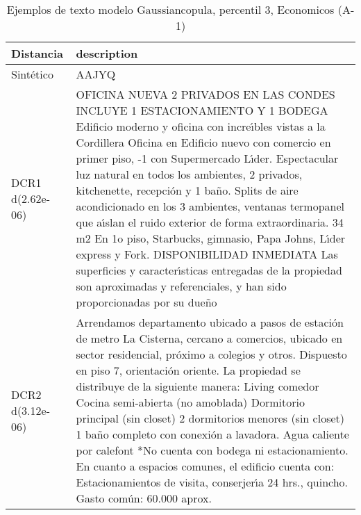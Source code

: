 \begin{table}[H]
\centering
\fontsize{10}{14}\selectfont
\caption{Ejemplos de texto modelo Gaussiancopula, percentil 3, Economicos (A-1)}
\label{table-example-economicos-a-1-gaussiancopula-3p-text}
\begin{tabular}{|l|m{35em}|}
\hline
\rowcolor[gray]{0.8}
Distancia & description \\
\hline Sintético & AAJYQ \\
\hline DCR1 d(2.62e-06) & OFICINA NUEVA 2 PRIVADOS EN LAS CONDES INCLUYE 1 ESTACIONAMIENTO Y 1 BODEGA  Edificio moderno y oficina con incre{\'\i}bles vistas a la Cordillera  Oficina en Edificio nuevo con comercio en primer piso, -1 con Supermercado L{\'\i}der. Espectacular luz natural en todos los ambientes, 2 privados, kitchenette, recepci\'on y 1 ba\~no. Splits de aire acondicionado en los 3 ambientes, ventanas termopanel que a{\'\i}slan el ruido exterior de forma extraordinaria.  34 m2  En 1o piso, Starbucks, gimnasio, Papa Johns, L{\'\i}der express y Fork.   DISPONIBILIDAD INMEDIATA   Las superficies y caracter{\'\i}sticas entregadas de la propiedad son aproximadas y referenciales, y han sido proporcionadas por su due\~no \\
\hline DCR2 d(3.12e-06) & Arrendamos departamento ubicado a pasos de estaci\'on de metro La Cisterna, cercano a comercios, ubicado en sector residencial, pr\'oximo a colegios y otros.  Dispuesto en piso 7, orientaci\'on oriente.  La propiedad se distribuye de la siguiente manera:  Living comedor Cocina semi-abierta (no amoblada) Dormitorio principal (sin closet) 2 dormitorios menores (sin closet) 1 ba\~no completo con conexi\'on a lavadora. Agua caliente por calefont  *No cuenta con bodega ni estacionamiento.  En cuanto a espacios comunes, el edificio cuenta con:  Estacionamientos de visita, conserjer{\'\i}a 24 hrs., quincho.  Gasto com\'un: 60.000 aprox. \\
\hline
\end{tabular}
\end{table}

